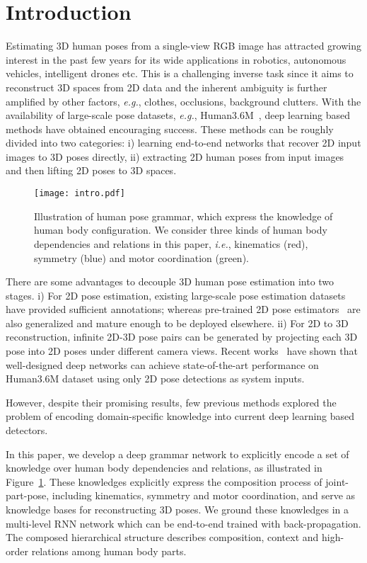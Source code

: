 \documentclass[letterpaper]{article} \usepackage{aaai18}  \usepackage{times}  \usepackage{helvet}  \usepackage{courier}  \usepackage{url}  \usepackage{color}
\begin{document}
\section{Introduction} \label{sec:intro}

Estimating 3D human poses from a single-view RGB image has attracted growing interest in the past few years for its wide applications in robotics, autonomous vehicles, intelligent drones etc.
This is a challenging inverse task since it aims to reconstruct 3D spaces from 2D data and the inherent ambiguity is further amplified by other factors, \textit{e.g.}, clothes, occlusions, background clutters. With the availability of large-scale pose datasets, \textit{e.g.}, Human3.6M~\cite{ionescu2014human3}, deep learning based methods have obtained encouraging success. These methods can be roughly divided into two categories: i) learning end-to-end networks that recover 2D input images to 3D poses directly, ii) extracting 2D human poses from input images and then lifting 2D poses to 3D spaces.

\begin{figure}[ptb]
\centering
\texttt{[image: intro.pdf]}
\caption{Illustration of human pose grammar, which express the knowledge of human body configuration. We consider three kinds of human body dependencies and relations in this paper, \textit{i.e.}, kinematics (red), symmetry (blue) and motor coordination (green).}
\label{fig:intro}
\end{figure}

There are some advantages to decouple 3D human pose estimation into two stages. i) For 2D pose estimation, existing large-scale pose estimation datasets~\cite{andriluka20142d,PoseDataset16} have provided sufficient annotations; whereas pre-trained 2D pose estimators~\cite{newell2016stacked} are also generalized and mature enough to be deployed elsewhere. ii) For 2D to 3D reconstruction, infinite 2D-3D pose pairs can be generated by projecting each 3D pose into 2D poses under different camera views. Recent works~\cite{yasin2016dual,martinez2017simple} have shown that well-designed deep networks can achieve state-of-the-art performance on Human3.6M dataset using only 2D pose detections as system inputs.

However, despite their promising results, few previous methods explored the problem of encoding domain-specific knowledge into current deep learning based detectors.

In this paper, we develop a deep grammar network to explicitly encode a set of knowledge over human body dependencies and relations, as illustrated in Figure~\ref{fig:intro}. These knowledges explicitly express the composition process of joint-part-pose, including kinematics, symmetry and motor coordination, and serve as knowledge bases for reconstructing 3D poses. We ground these knowledges in a multi-level RNN network which can be end-to-end trained with back-propagation. The composed hierarchical structure describes composition, context and high-order relations among human body parts.
\end{document}

